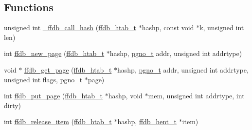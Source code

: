 \subsection*{Functions}
\begin{DoxyCompactItemize}
\item 
unsigned int \mbox{\hyperlink{adat-devel_2other__libs_2filedb_2filehash_2ffdb__hash_8h_a2f4a425a3740bb0320ef61b8c9fdcef1}{\+\_\+ffdb\+\_\+call\+\_\+hash}} (\mbox{\hyperlink{adat-devel_2other__libs_2filedb_2filehash_2ffdb__hash_8h_ae592010ed2bedc975d3cc0b7d074b9d1}{ffdb\+\_\+htab\+\_\+t}} $\ast$hashp, const void $\ast$k, unsigned int len)
\item 
int \mbox{\hyperlink{adat-devel_2other__libs_2filedb_2filehash_2ffdb__hash_8h_a3781c690210dc9ff030bca63ca76b521}{ffdb\+\_\+new\+\_\+page}} (\mbox{\hyperlink{adat-devel_2other__libs_2filedb_2filehash_2ffdb__hash_8h_ae592010ed2bedc975d3cc0b7d074b9d1}{ffdb\+\_\+htab\+\_\+t}} $\ast$hashp, \mbox{\hyperlink{adat-devel_2other__libs_2filedb_2filehash_2ffdb__db_8h_a000813331643d38481142bcce7de1501}{pgno\+\_\+t}} addr, unsigned int addrtype)
\item 
void $\ast$ \mbox{\hyperlink{adat-devel_2other__libs_2filedb_2filehash_2ffdb__hash_8h_a98ebf14ea54004928fd71e2bbcd3d79a}{ffdb\+\_\+get\+\_\+page}} (\mbox{\hyperlink{adat-devel_2other__libs_2filedb_2filehash_2ffdb__hash_8h_ae592010ed2bedc975d3cc0b7d074b9d1}{ffdb\+\_\+htab\+\_\+t}} $\ast$hashp, \mbox{\hyperlink{adat-devel_2other__libs_2filedb_2filehash_2ffdb__db_8h_a000813331643d38481142bcce7de1501}{pgno\+\_\+t}} addr, unsigned int addrtype, unsigned int flags, \mbox{\hyperlink{adat-devel_2other__libs_2filedb_2filehash_2ffdb__db_8h_a000813331643d38481142bcce7de1501}{pgno\+\_\+t}} $\ast$page)
\item 
int \mbox{\hyperlink{adat-devel_2other__libs_2filedb_2filehash_2ffdb__hash_8h_aee8d402020a44a72f40cff30ae2f9bd9}{ffdb\+\_\+put\+\_\+page}} (\mbox{\hyperlink{adat-devel_2other__libs_2filedb_2filehash_2ffdb__hash_8h_ae592010ed2bedc975d3cc0b7d074b9d1}{ffdb\+\_\+htab\+\_\+t}} $\ast$hashp, void $\ast$mem, unsigned int addrtype, int dirty)
\item 
int \mbox{\hyperlink{adat-devel_2other__libs_2filedb_2filehash_2ffdb__hash_8h_abcfe17261335c76475086e59ab020290}{ffdb\+\_\+release\+\_\+item}} (\mbox{\hyperlink{adat-devel_2other__libs_2filedb_2filehash_2ffdb__hash_8h_ae592010ed2bedc975d3cc0b7d074b9d1}{ffdb\+\_\+htab\+\_\+t}} $\ast$hashp, \mbox{\hyperlink{adat-devel_2other__libs_2filedb_2filehash_2ffdb__hash_8h_aa1cea5ccbd6513ed152988f7a71a936d}{ffdb\+\_\+hent\+\_\+t}} $\ast$item)

\end{DoxyCompactItemize}
